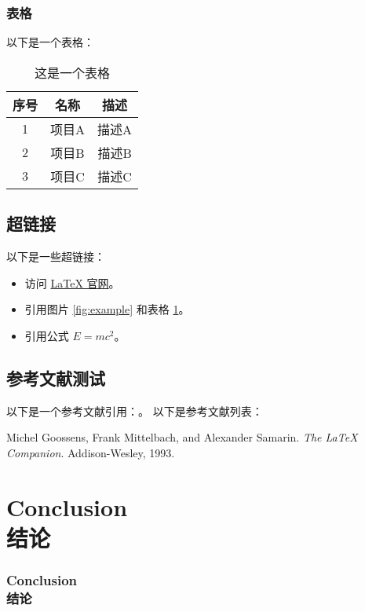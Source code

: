 \documentclass[aspectratio=169]{beamer}
\begin{document}
\subsubsection{表格}
\begin{frame}
以下是一个表格：
\begin{table}[htbp]
    \centering
    \begin{tabular}{|c|c|c|}
        \hline
        序号 & 名称 & 描述 \\
        \hline
        1 & 项目A & 描述A \\
        2 & 项目B & 描述B \\
        3 & 项目C & 描述C \\
        \hline
    \end{tabular}
    \caption{这是一个表格}
    \label{tab:example}
\end{table}
\end{frame}

\subsection{超链接}
\begin{frame}
以下是一些超链接：
\begin{itemize}
    \item 访问 \href{https://www.latex-project.org/}{LaTeX 官网}。
    \item 引用图片 \ref{fig:example} 和表格 \ref{tab:example}。
    \item 引用公式 \( E = mc^2 \)。
\end{itemize}
\end{frame}

\subsection{参考文献测试}
\begin{frame}
以下是一个参考文献引用：\cite{latexcompanion}。
\framebreak
以下是参考文献列表：
\begin{thebibliography}{9}
    Michel Goossens, Frank Mittelbach, and Alexander Samarin.
    \textit{The LaTeX Companion}.
    Addison-Wesley, 1993.
\end{thebibliography}
\end{frame}

\section{Conclusion\\结论}
\begin{frame}
  \frametitle{Conclusion\\结论}
  \lipsum[3]
  \framebreak
  \zhlipsum[3]
\end{frame}
\end{document}
